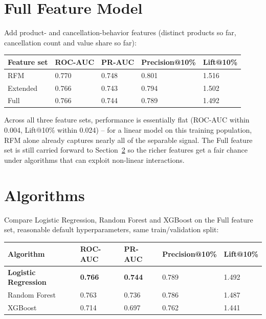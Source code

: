 \section{Full Feature Model}
\label{sec:6-5}

Add product- and cancellation-behavior features (distinct products so far, cancellation count and value share so far):

\begin{center}
\begin{tabular}{@{}p{2.6cm}p{1.8cm}p{1.8cm}p{2.4cm}p{1.8cm}@{}}
    \toprule
    Feature set & ROC-AUC & PR-AUC & Precision@10\% & Lift@10\% \\
    \midrule
    RFM & 0.770 & 0.748 & 0.801 & 1.516 \\
    Extended & 0.766 & 0.743 & 0.794 & 1.502 \\
    Full & 0.766 & 0.744 & 0.789 & 1.492 \\
    \bottomrule
\end{tabular}
\end{center}

Across all three feature sets, performance is essentially flat (ROC-AUC within 0.004, Lift@10\% within 0.024) -- for a linear model on this training population, RFM alone already captures nearly all of the separable signal. The Full feature set is still carried forward to Section~\ref{sec:6-6} so the richer features get a fair chance under algorithms that can exploit non-linear interactions.

\section{Algorithms}
\label{sec:6-6}

Compare Logistic Regression, Random Forest and XGBoost on the Full feature set, reasonable default hyperparameters, same train/validation split:

\begin{center}
\begin{tabular}{@{}p{3.6cm}p{1.8cm}p{1.8cm}p{2.4cm}p{1.8cm}@{}}
    \toprule
    Algorithm & ROC-AUC & PR-AUC & Precision@10\% & Lift@10\% \\
    \midrule
    \textbf{Logistic Regression} & \textbf{0.766} & \textbf{0.744} & 0.789 & 1.492 \\
    Random Forest & 0.763 & 0.736 & 0.786 & 1.487 \\
    XGBoost & 0.714 & 0.697 & 0.762 & 1.441 \\
    \bottomrule
\end{tabular}
\end{center}

